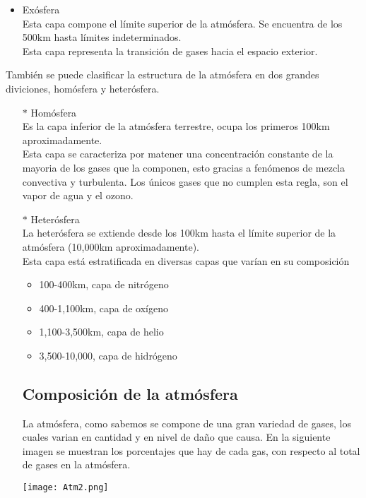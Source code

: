 \documentclass[a4paper]{article}
\begin{document}
\begin{itemize}
\item Exósfera \\
Esta capa compone el límite superior de la atmósfera. Se encuentra de los 500km hasta límites indeterminados. \\
Esta capa representa la transición de gases hacia el espacio exterior. \\

\end{itemize}

También se puede clasificar la estructura de la atmósfera en dos grandes diviciones, homósfera y heterósfera. \\  
\begin{itemize}
\item [$*$]Homósfera \\
Es la capa inferior de la atmósfera terrestre, ocupa los primeros 100km aproximadamente. \\
Esta capa se caracteriza por matener una concentración constante de la mayoria de los gases que la componen, esto gracias a fenómenos de mezcla convectiva y turbulenta. Los únicos gases que no cumplen esta regla, son el vapor de agua y el ozono. \\

\item [$*$]Heterósfera  \\ 
La heterósfera se extiende desde los 100km hasta el límite superior de la atmósfera (10,000km aproximadamente). \\ Esta capa está estratificada en diversas capas que varían en  su composición \\ 
\begin{itemize}
\item 100-400km, capa de nitrógeno
\item 400-1,100km, capa de oxígeno
\item 1,100-3,500km, capa de helio
\item 3,500-10,000, capa de hidrógeno
\end{itemize}

\vspace{1.3cm}

\subsection*{\Large Composición de la atmósfera}
La atmósfera, como sabemos se compone de una gran variedad de gases, los cuales varian en cantidad y en nivel de daño que causa. En la siguiente imagen se muestran los porcentajes que hay de cada gas, con respecto al total de gases en la atmósfera.
\\
\begin{center}
\texttt{[image: Atm2.png]}
\end{center}
\end{itemize}
\vspace{1.75cm}
\end{document}
